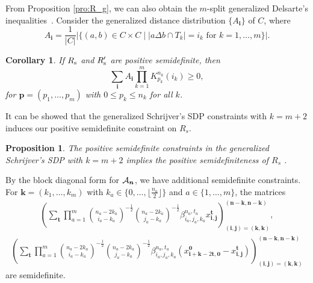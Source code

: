 \documentclass[final,onecolumn]{IEEEtran}
\newtheorem{corollaryenv}[definitionenv]{Corollary}
\newtheorem{propositionenv}[definitionenv]{Proposition}
\newenvironment{corollary}{\begin{corollaryenv}\rm}{\end{corollaryenv}}
\newenvironment{proposition}{\begin{propositionenv}\rm}{\end{propositionenv}}
\theoremstyle{definition}
\newcommand{\bmo}{{\bm 0}}
\newcommand{\bmi}{{\bm i}}
\newcommand{\bmj}{{\bm j}}
\newcommand{\bmn}{{\bm n}}
\newcommand{\bmk}{{\bm k}}
\newcommand{\bms}{{\bm s}}
\newcommand{\bmt}{{\bm t}}
\newcommand{\bmp}{{\bm p}}
\begin{document}
From Proposition \ref{pro:R_g}, we can also obtain the $m$-split generalized Delsarte's inequalities~\cite{Sim95}. Consider the generalized distance distribution $\{A_{\bmi}\}$ of $C$, where
\begin{equation*}
	A_{\bmi} = \frac{1}{\lvert C\rvert}\lvert\{(a, b) \in C \times C \mid \lvert a \Delta b \cap T_{k}\rvert = i_{k} \text{ for } k=1,\dots,m\}\rvert.
\end{equation*}
\begin{corollary} 
	If $R_{\rm \bms}$ and $R_{\rm \bms}'$ are positive semidefinite, then
	\label{coro:m_gen_del}
	\begin{equation}
		\sum_{\bmi} A_{\bmi} \prod_{k = 1}^{m}K_{p_{k}}^{n_{k}}(i_{k}) \geq 0,
	\end{equation}
	for $\bmp = (p_{1}, \dots, p_{m})$ with $0 \leq p_{k} \leq n_{k}$ for all $k$.
\end{corollary}


It can be showed that the generalized Schrijver's SDP constraints with $k = m+2$ induces our positive semidefinite constraint on $R_{s}$.

\begin{proposition}
    The positive semidefinite constraints in the generalized Schrijver's SDP with $k = m+2$ implies the positive semidefiniteness of $R_{s}$ .
\end{proposition}

	
By the block diagonal form for ${\cal A}_{\bmn}$, we have additional semidefinite constraints. For $\bmk = (k_{1}, \dots, k_{m})$ with $k_{a} \in \{0, \dots, \lfloor \frac{n_{a}}{2} \rfloor \}$ and $a \in\{1, \dots, m\}$, the matrices
\begin{equation}
	\label{eq:gen_sdp_1}
	\begin{aligned}
		\left( \sum_{\bmt} \prod_{a = 1}^{m} \binom{n_{a}-2k_{a}}{i_{a}-k_{a}}^{-\frac{1}{2}} \binom{n_{a}-2k_{a}}{j_{a}-k_{a}}^{-\frac{1}{2}}  \beta_{i_{a}, j_{a}, k_{a}}^{n_{a}, t_{a}} x_{\bmi, \bmj}^{\bmt} \right)_{(\bmi, \bmj) = (\bmk, \bmk)}^{(\bmn-\bmk, \bmn-\bmk)},
	\end{aligned} 
\end{equation}
\begin{equation}
	\label{eq:gen_sdp_2}
	\begin{aligned}
		\left( \sum_{\bmt} \prod_{a = 1}^{m} \binom{n_{a}-2k_{a}}{i_{a}-k_{a}}^{-\frac{1}{2}} \binom{n_{a}-2k_{a}}{j_{a}-k_{a}}^{-\frac{1}{2}}  \beta_{i_{a}, j_{a}, k_{a}}^{n_{a}, t_{a}} (x_{\bmi+\bmk-2\bmt, \bmo}^{\bmo}-x_{\bmi, \bmj}^{\bmt}) \right)_{(\bmi, \bmj) = (\bmk, \bmk)}^{(\bmn-\bmk, \bmn-\bmk)}
	\end{aligned} 
\end{equation}
are semidefinite.
	
\end{document}
